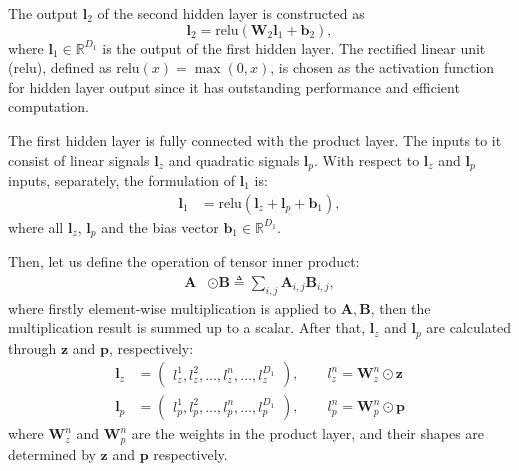 \documentclass[conference]{IEEEtran}
\newcommand{\bs}{\boldsymbol}
\newcommand{\bW}{\bs{W}}
\newcommand{\bb}{\bs{b}}
\newcommand{\bl}{\bs{l}}
\newcommand{\bz}{\bs{z}}
\newcommand{\bp}{\bs{p}}
\newcommand{\mR}{\mathbb{R}}
\newcommand{\relu}{\text{relu}}
\newcommand{\weinan}[1]{{\bf \color{red} [[Weinan says ``#1'']]}}
\begin{document}
The output $\bl_2$ of the second hidden layer is constructed as
\begin{equation}
\bl_2 = \relu(\bW_2 \bl_1 + \bb_2),
\end{equation}
where $\bl_1 \in \mR^{D_1}$ is the output of the first hidden layer. The rectified linear unit (relu), defined as $\relu(x) = \max(0, x)$, is chosen as the activation function for hidden layer output since it has outstanding performance and efficient computation.

The first hidden layer is fully connected with the product layer. The inputs to it consist of linear signals $\bl_z$ and quadratic signals $\bl_p$. With respect to $\bl_z$ and $\bl_p$ inputs, separately, the formulation of $\bl_1$ is:
\begin{align}\label{eq:l1-formula}
\bl_1 &= \relu(\bl_z + \bl_p + \bb_1),
\end{align}
where all $\bl_z$, $\bl_p$ and the bias vector $\bb_1 \in \mR^{D_1}$.

Then, let us define the operation of tensor inner product:
\begin{align}
\bs{A} & \odot \bs{B} \triangleq \sum_{i,j} \bs{A}_{i,j} \bs{B}_{i,j},
\end{align}
where firstly element-wise multiplication is applied to $\bs{A}, \bs{B}$, then the multiplication result is summed up to a scalar. After that,
$\bl_z$ and $\bl_p$ are calculated through $\bz$ and $\bp$, respectively:
\begin{align}\label{eq:l1-lz-lp}
\bl_z &= \begin{pmatrix}
l_z^1, l_z^2, \ldots, l_z^n, \ldots , l_z^{D_1}
\end{pmatrix}, \qquad l_z^n = \bW_z^n \odot \bz\\
\bl_p &= \begin{pmatrix}
l_p^1, l_p^2, \ldots, l_p^n, \ldots , l_p^{D_1}
\end{pmatrix}, \qquad l_p^n = \bW_p^n \odot \bp  \nonumber
\end{align}
where $\bW_z^n$ and $\bW_p^n$ are the weights in the product layer, and their shapes are determined by $\bz$ and $\bp$ respectively.
\end{document}
